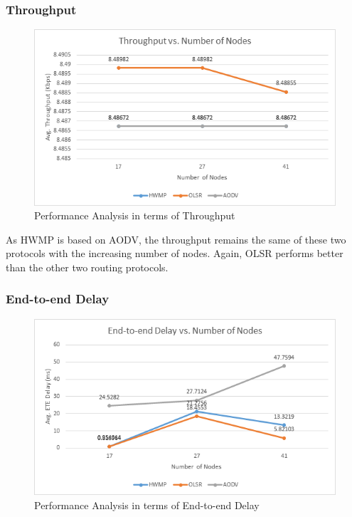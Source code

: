 \documentclass[12pt,a4paper]{report}
\begin{document}

\subsubsection{Throughput}

\begin{figure}[hbtp]
\centering
\includegraphics[scale=.7]{Graphs/Throghput-vs-nodes.png}
\caption{Performance Analysis in terms of Throughput}
\end{figure}
As HWMP is based on AODV, the throughput remains the same of these two protocols with the increasing number of nodes. Again, OLSR performs better than the other two routing protocols.
\newpage

\subsubsection{End-to-end Delay}

\begin{figure}[hbtp]
\centering
\includegraphics[scale=.7]{Graphs/ETE-vs-nodes.png}
\caption{Performance Analysis in terms of End-to-end Delay}
\end{figure}
\end{document}
